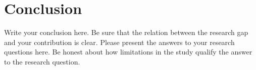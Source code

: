 \section{Conclusion}
\label{sec:conclusion}
Write your conclusion here. Be sure that the relation between the research gap and your contribution is clear. Please present the answers to your research questions here. Be honest about how limitations in the study qualify the answer to the research question.